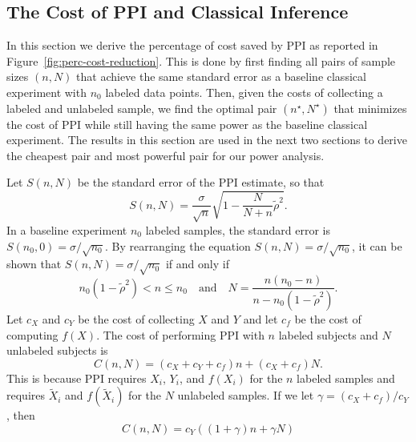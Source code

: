 \subsection{The Cost of PPI and Classical Inference}

In this section we derive the percentage of cost saved by PPI as reported in Figure~\ref{fig:perc-cost-reduction}. This is done by first finding all pairs of sample sizes $(n,N)$ that achieve the same standard error as a baseline classical experiment with $n_0$ labeled data points. Then, given the costs of collecting a labeled and unlabeled sample, we find the optimal pair $(n^\star,  N^\star)$ that minimizes the cost of PPI while still having the same power as the baseline classical experiment. The results in this section are used in the next two sections to derive the cheapest pair and most powerful pair for our power analysis.

Let $S(n,N)$ be the standard error of the PPI estimate, so that
\[
    S(n,N) = \frac{\sigma}{\sqrt{n}}\sqrt{1- \frac{N}{N+n}\tilde{\rho}^2}. 
\]
In a baseline experiment $n_0$ labeled samples, the standard error is $S(n_0, 0) = \sigma/\sqrt{n_0}$. By rearranging the equation $S(n,N) = \sigma/\sqrt{n_0}$, it can be shown that $S(n,N)=\sigma/\sqrt{n_0}$ if and only if 
\begin{equation}
n_0(1-\tilde{\rho}^2) < n \le n_0 \quad \text{and} \quad
    N = \frac{n(n_0 - n)}{n-n_0(1-\tilde{\rho}^2)} .\label{eq:level curves}
\end{equation}
Let $c_X$ and $c_Y$ be the cost of collecting $X$ and $Y$ and let $c_f$ be the cost of computing $f(X)$.  The cost of performing PPI with $n$ labeled subjects and $N$ unlabeled subjects is 
\begin{equation*}
    C(n,N) = (c_X+c_Y+c_f)n + (c_X+c_f)N.
\end{equation*}
This is because PPI requires $X_i$, $Y_i$, and $f(X_i)$ for the $n$ labeled samples and requires $\widetilde{X}_i$ and $f(\widetilde{X}_i)$ for the $N$ unlabeled samples. If we let $\gamma = (c_X+c_f)/c_Y$, then
\begin{equation*}
    C(n,N) = c_Y((1+\gamma) n + \gamma N)
\end{equation*}


